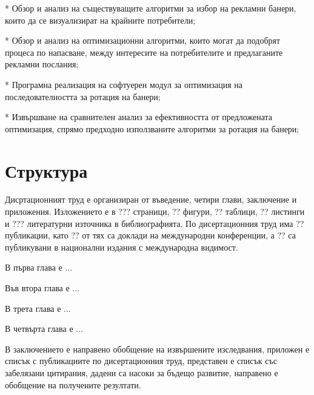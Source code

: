 * Обзор и анализ на съществуващите алгоритми за избор на рекламни банери, които да се визуализират на крайните потребители;

* Обзор и анализ на оптимизационни алгоритми, които могат да подобрят процеса по напасване, между интересите на потребителите и предлаганите рекламни послания;

* Програмна реализация на софтуерен модул за оптимизация на последователността за ротация на банери;

* Извършване на сравнителен анализ за ефективността от предложената оптимизация, спрямо предходно използваните алгоритми за ротация на банери;

\section*{Структура}

Дисртационният труд е организиран от въведение, четири глави, заключение и приложения. Изложението е в ??? страници, ?? фигури, ?? таблици, ?? листинги и ??? литературни източника в библиографията. По дисертационния труд има ?? публикации, като ?? от тях са доклади на международни конференции, а ?? са публикувани в национални издания с международна видимост. 

В първа глава е ...

Във втора глава е ...

В трета глава е ...

В четвърта глава е ...

В заключението е направено обобщение на извършените изследвания, приложен е списък с публикациите по дисертационния труд, представен е списък със забелязани цитирания, дадени са насоки за бъдещо развитие, направено е обобщение на получените резултати.

